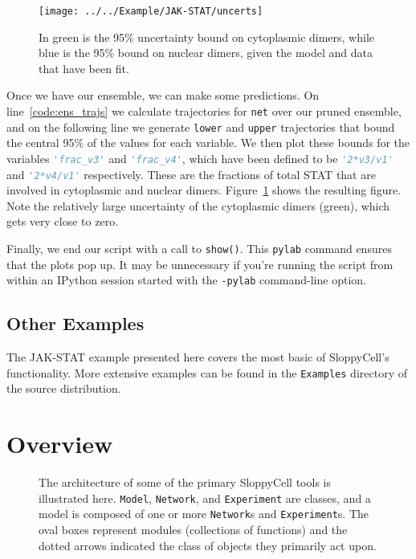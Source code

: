 \documentclass[12pt]{article}
\makeatletter
\newcommand{\py}[1]{\lstinline[language=Python, showstringspaces=False]@#1@}
\newcommand{\shell}[1]{\lstinline[language=csh, showstringspaces=False]!#1!}
\makeatother
\begin{document}
\begin{figure}
\begin{center}
\texttt{[image: ../../Example/JAK-STAT/uncerts]}
\end{center}
\caption[Prediction uncertainties for the JAK-STAT model]{In green is the 95\% uncertainty bound on cytoplasmic dimers, while blue is the 95\% bound on nuclear dimers, given the model and data that have been fit.\label{fig:user:uncerts}}
\end{figure}

Once we have our ensemble, we can make some predictions.
On line~\ref{code:ens_trajs} we calculate trajectories for \py{net} over our pruned ensemble, and on the following line we generate \py{lower} and \py{upper} trajectories that bound the central 95\% of the values for each variable.
We then plot these bounds for the variables \py{'frac_v3'} and \py{'frac_v4'}, which have been defined to be \py{'2*v3/v1'} and \py{'2*v4/v1'} respectively. These are the fractions of total STAT that are involved in cytoplasmic and nuclear dimers.
Figure~\ref{fig:user:uncerts} shows the resulting figure.
Note the relatively large uncertainty of the cytoplasmic dimers (green), which gets very close to zero.

Finally, we end our script with a call to \py{show()}. This \py{pylab} command ensures that the plots pop up. It may be unnecessary if you're running the script from within an IPython session started with the \shell{-pylab} command-line option.

\subsection{Other Examples}

The JAK-STAT example presented here covers the most basic of SloppyCell's functionality.
More extensive examples can be found in the \shell{Examples} directory of the source distribution.

\section{Overview}

\begin{figure}
\begin{center}

\end{center}
\caption{The architecture of some of the primary SloppyCell tools is illustrated here. \py{Model}, \py{Network}, and \py{Experiment} are classes, and a model is composed of one or more \py{Network}s and \py{Experiment}s. The oval boxes represent modules (collections of functions) and the dotted arrows indicated the class of objects they primarily act upon.}
\end{figure}
\end{document}
